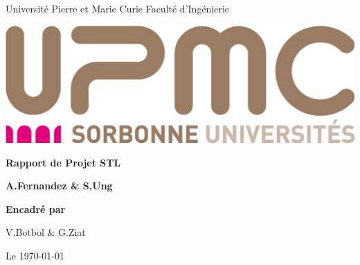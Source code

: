 \begin{titlepage}
\parindent=0pt
Université Pierre et Marie Curie   Faculté d'Ingénierie
\begin{center}
\includegraphics[scale=0.2]{images/logo_upmc.jpg}%
\end{center}
\hrulefill
\begin{center}\bfseries\Huge
  Rapport de Projet STL
\end{center}
\hrulefill
\vspace*{1cm}
\begin{center}\bfseries\Large
A.Fernandez \& S.Ung
\end{center}
    
\begin{center}\bfseries\Large
Encadré par

V.Botbol \& G.Ziat
\end{center}
\begin{flushright}
  Le \today 
\end{flushright}   

\end{titlepage}